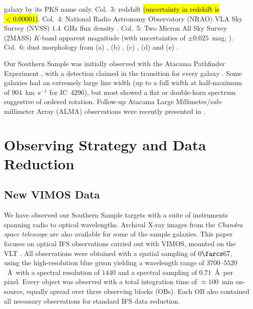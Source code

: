 \documentclass[a4paper,fleqn,usenatbib]{mnras}
\DeclareRobustCommand{\added}[1]{{\sethlcolor{green}\hl{#1}}}
\begin{document}
\begin{table}[t]
\begin{center}
{      galaxy by its PKS name only. Col.~3: redshift \added{(uncertainty in redshift is $< 0.00001$)}. Col.~4: National
      Radio Astronomy Observatory (NRAO) VLA Sky Survey (NVSS)
      $1.4$~GHz flux density \citep{Condon1998}. Col.~5: Two Micron
      All Sky Survey (2MASS) $K$-band apparent magnitude (with
      uncertainties of $\pm0.025$~mag;
      \citealt{Skrutskie2006}). Col.~6: dust morphology from (a)
      \citet{Govoni2000}, (b) \citet{Lauer2005}, (c)
      \citet{Bettoni2001}, (d) \citet{Sandage1979} and (e)
      \citet{Colbert2001}.}
  \end{center}
\end{table}

Our Southern Sample was initially observed with the Atacama Pathfinder
Experiment \citep[APEX; ][]{Gusten2006}, with a detection claimed in
the  transition for every galaxy
\citep{Prandoni2012}. Some galaxies had an extremely large line width
(up to a full width at half-maximum of $904$~km~s$^{-1}$ for IC~4296),
but most showed a flat or double-horn spectrum suggestive of ordered
rotation. Follow-up Atacama Large Millimeter/sub-millimeter Array
(ALMA) observations were recently presented in \citet{ruffa2019a,
  ruffa2019b}.

\section{Observing Strategy and Data Reduction}
\label{sec:obs}

\subsection{New VIMOS Data}
\label{subsec:VIMOS}

We have observed our Southern Sample targets with a suite of
instruments spanning radio to optical wavelengths. Archival X-ray
images from the \textit{Chandra space telescope} are also available
for some of the sample galaxies. This paper focuses on optical IFS
observations carried out with VIMOS, mounted on the VLT
\citep{LeFevre2003}. All observations were obtained with a spatial
sampling of $0\farcs67$, using the high-resolution blue grism yielding
a wavelength range of $3700$--$5520$~\AA\ with a spectral resolution
of $1440$ and a spectral sampling of $0.71$~\AA\ per pixel. Every
object was observed with a total integration time of $\approx100$~min
on-source, equally spread over three observing blocks (OBs). Each OB
also contained all necessary observations for standard IFS data
reduction.
\end{document}
